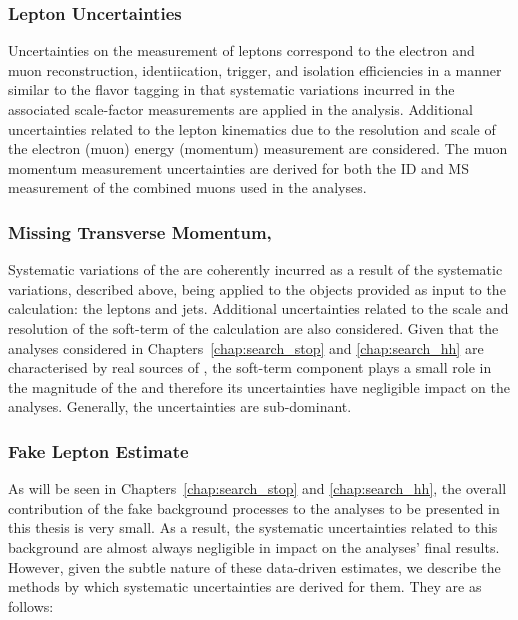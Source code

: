 \subsubsection{Lepton Uncertainties}
Uncertainties on the measurement of leptons correspond to the electron and muon reconstruction,
identiication, trigger, and isolation efficiencies in a manner similar to the flavor tagging
in that systematic variations incurred in the associated scale-factor measurements are applied
in the analysis.
Additional uncertainties related to the lepton kinematics due to the resolution and scale of the
electron (muon) energy (momentum) measurement are considered.
The muon momentum measurement uncertainties are derived for both the ID and MS measurement
of the combined muons used in the analyses.

\subsubsection{Missing Transverse Momentum, \met}
Systematic variations of the \met are coherently incurred as a result of the
systematic variations, described above, being applied to the objects provided as input to the \met calculation:
the leptons and jets.
Additional uncertainties related to the scale and resolution of the soft-term of the \met calculation
are also considered.
Given that the analyses considered in Chapters~\ref{chap:search_stop} and \ref{chap:search_hh}
are characterised by real sources of \met, the soft-term component plays a small role in the magnitude
of the \met and therefore its uncertainties have negligible impact on the analyses.
Generally, the \met uncertainties are sub-dominant.

\subsubsection{Fake Lepton Estimate}

As will be seen in Chapters~\ref{chap:search_stop} and \ref{chap:search_hh}, the overall contribution
of the fake background processes to the analyses to be presented in this thesis is very small.
As a result, the systematic uncertainties related to this background are almost always negligible
in impact on the analyses' final results.
However, given the subtle nature of these data-driven estimates, we describe the methods by which
systematic uncertainties are derived for them.
They are as follows:

